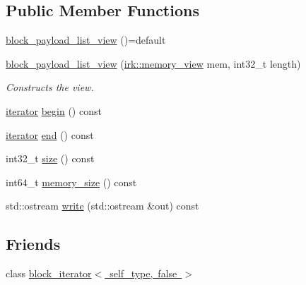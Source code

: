 \subsection*{Public Member Functions}
\begin{DoxyCompactItemize}
\item 
\mbox{\hyperlink{classirk_1_1index_1_1block__payload__list__view_af9da50c8dbc7ae9d4544d7b6a367fce6}{block\+\_\+payload\+\_\+list\+\_\+view}} ()=default
\item 
\mbox{\hyperlink{classirk_1_1index_1_1block__payload__list__view_aee904f5af8fd319298b5a6f4067dc1ef}{block\+\_\+payload\+\_\+list\+\_\+view}} (\mbox{\hyperlink{classirk_1_1memory__view}{irk\+::memory\+\_\+view}} mem, int32\+\_\+t length)
\begin{DoxyCompactList}\small\item\em Constructs the view. \end{DoxyCompactList}\item 
\mbox{\hyperlink{classirk_1_1index_1_1block__payload__list__view_a201e879cc73a3fd9476a2e1043f4d74d}{iterator}} \mbox{\hyperlink{classirk_1_1index_1_1block__payload__list__view_a6267168ba7e590b9f068bc804866311e}{begin}} () const
\item 
\mbox{\hyperlink{classirk_1_1index_1_1block__payload__list__view_a201e879cc73a3fd9476a2e1043f4d74d}{iterator}} \mbox{\hyperlink{classirk_1_1index_1_1block__payload__list__view_a1b16598d74b7ee7ba5a09ddfe0e2a883}{end}} () const
\item 
int32\+\_\+t \mbox{\hyperlink{classirk_1_1index_1_1block__payload__list__view_a3def9dafc4213e24a9362f9ffbf9aebb}{size}} () const
\item 
int64\+\_\+t \mbox{\hyperlink{classirk_1_1index_1_1block__payload__list__view_a4d4e7da26085b5ad507e2e353c27f068}{memory\+\_\+size}} () const
\item 
std\+::ostream \mbox{\hyperlink{classirk_1_1index_1_1block__payload__list__view_af2ec3b8d5a76b9224531d444812c057c}{write}} (std\+::ostream \&out) const
\end{DoxyCompactItemize}
\subsection*{Friends}
\begin{DoxyCompactItemize}
\item 
class \mbox{\hyperlink{classirk_1_1index_1_1block__payload__list__view_a88a9a271d334c6a1ee36182f15227581}{block\+\_\+iterator$<$ self\+\_\+type, false $>$}}
\end{DoxyCompactItemize}


